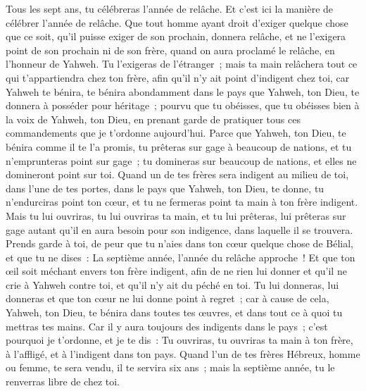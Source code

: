 \begin{multicols}{2}
\VerseOne{}Tous les sept ans, tu célébreras l'année de relâche.
Et c'est ici la manière de célébrer l'année de relâche. Que tout homme ayant droit d'exiger quelque chose que ce soit, qu'il puisse exiger de son prochain, donnera relâche, et ne l'exigera point de son prochain ni de son frère, quand on aura proclamé le relâche, en l'honneur de Yahweh.
Tu l'exigeras de l'étranger~; mais ta main relâchera tout ce qui t'appartiendra chez ton frère,
afin qu'il n'y ait point d'indigent chez toi, car Yahweh te bénira, te bénira abondamment dans le pays que Yahweh, ton Dieu, te donnera à posséder pour héritage~;
pourvu que tu obéisses, que tu obéisses bien à la voix de Yahweh, ton Dieu, en prenant garde de pratiquer tous ces commandements que je t'ordonne aujourd'hui.
Parce que Yahweh, ton Dieu, te bénira comme il te l'a promis, tu prêteras sur gage à beaucoup de nations, et tu n'emprunteras point sur gage~; tu domineras sur beaucoup de nations, et elles ne domineront point sur toi.
Quand un de tes frères sera indigent au milieu de toi, dans l'une de tes portes, dans le pays que Yahweh, ton Dieu, te donne, tu n'endurciras point ton cœur, et tu ne fermeras point ta main à ton frère indigent.
Mais tu lui ouvriras, tu lui ouvriras ta main, et tu lui prêteras, lui prêteras sur gage autant qu'il en aura besoin pour son indigence, dans laquelle il se trouvera.
Prends garde à toi, de peur que tu n'aies dans ton cœur quelque chose de Bélial, et que tu ne dises~: La septième année, l'année du relâche approche~! Et que ton œil soit méchant envers ton frère indigent, afin de ne rien lui donner et qu'il ne crie à Yahweh contre toi, et qu'il n'y ait du péché en toi.
Tu lui donneras, lui donneras et que ton cœur ne lui donne point à regret~; car à cause de cela, Yahweh, ton Dieu, te bénira dans toutes tes œuvres, et dans tout ce à quoi tu mettras tes mains.
Car il y aura toujours des indigents dans le pays~; c'est pourquoi je t'ordonne, et je te dis~: Tu ouvriras, tu ouvriras ta main à ton frère, à l'affligé, et à l'indigent dans ton pays.
Quand l'un de tes frères Hébreux, homme ou femme, te sera vendu, il te servira six ans~; mais la septième année, tu le renverras libre de chez toi.

\end{multicols}
